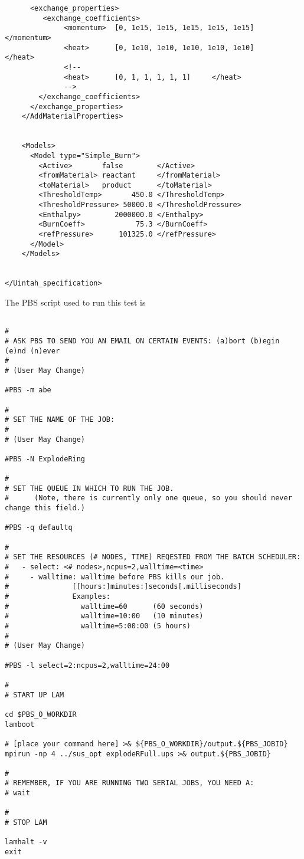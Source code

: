 \begin{lstlisting}
      <exchange_properties>
         <exchange_coefficients>
              <momentum>  [0, 1e15, 1e15, 1e15, 1e15, 1e15]     </momentum>
              <heat>      [0, 1e10, 1e10, 1e10, 1e10, 1e10]     </heat>
              <!--
              <heat>      [0, 1, 1, 1, 1, 1]     </heat>
              -->
        </exchange_coefficients>
      </exchange_properties>
    </AddMaterialProperties>


    <Models>
      <Model type="Simple_Burn">
        <Active>       false        </Active>
        <fromMaterial> reactant     </fromMaterial>
        <toMaterial>   product      </toMaterial>
        <ThresholdTemp>       450.0 </ThresholdTemp>
        <ThresholdPressure> 50000.0 </ThresholdPressure>
        <Enthalpy>        2000000.0 </Enthalpy>
        <BurnCoeff>            75.3 </BurnCoeff>
        <refPressure>      101325.0 </refPressure>
      </Model>
    </Models>


</Uintah_specification>
  \end{lstlisting}

The PBS script used to run this test  is
\begin{lstlisting}

#
# ASK PBS TO SEND YOU AN EMAIL ON CERTAIN EVENTS: (a)bort (b)egin (e)nd (n)ever
#
# (User May Change)

#PBS -m abe

#
# SET THE NAME OF THE JOB:
#
# (User May Change)

#PBS -N ExplodeRing

#
# SET THE QUEUE IN WHICH TO RUN THE JOB.
#      (Note, there is currently only one queue, so you should never change this field.)

#PBS -q defaultq

#
# SET THE RESOURCES (# NODES, TIME) REQESTED FROM THE BATCH SCHEDULER:
#   - select: <# nodes>,ncpus=2,walltime=<time>
#     - walltime: walltime before PBS kills our job.
#               [[hours:]minutes:]seconds[.milliseconds]
#               Examples:
#                 walltime=60      (60 seconds)
#                 walltime=10:00   (10 minutes)
#                 walltime=5:00:00 (5 hours)
#
# (User May Change)

#PBS -l select=2:ncpus=2,walltime=24:00

#
# START UP LAM

cd $PBS_O_WORKDIR
lamboot

# [place your command here] >& ${PBS_O_WORKDIR}/output.${PBS_JOBID}
mpirun -np 4 ../sus_opt explodeRFull.ups >& output.${PBS_JOBID}

#
# REMEMBER, IF YOU ARE RUNNING TWO SERIAL JOBS, YOU NEED A:
# wait

#
# STOP LAM

lamhalt -v
exit
\end{lstlisting}

%  
%  

%

